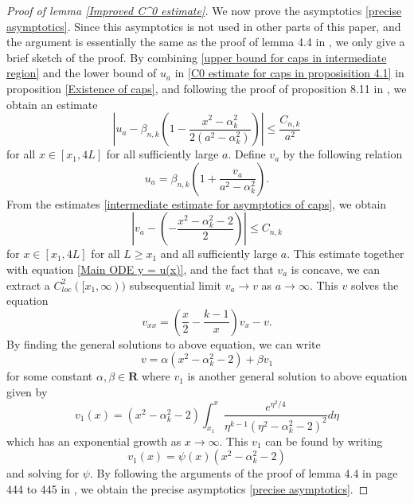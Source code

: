 \documentclass[pdflatex,sn-mathphys-num]{sn-jnl}
\begin{document}
\begin{proof}[Proof of lemma \ref{Improved C^0 estimate}]
We now prove the asymptotics \eqref{precise asymptotics}. Since this asymptotics is not used in other parts of this paper, and the argument is essentially the same as the proof of lemma 4.4 in \cite{ADS}, we only give a brief sketch of the proof. By combining \eqref{upper bound for caps in intermediate region} and the lower bound of $u_a$ in \eqref{C0 estimate for caps in proposisition 4.1} in proposition \ref{Existence of caps}, and following the proof of proposition 8.11 in \cite{ADS}, we obtain an estimate
    \begin{equation}\label{intermediate estimate for asymptotics of caps}
        |u_a - \beta_{n,k}(1 - \frac{x^2 - \alpha_k^2}{2(a^2 - \alpha_k^2)})| \leq \frac{C_{n,k}}{a^2}
    \end{equation}
    for all $x \in [x_1, 4L]$ for all sufficiently large $a$. Define $v_a$ by the following relation
    \begin{equation}
        u_a = \beta_{n,k}(1 + \frac{v_a}{a^2 - \alpha_k^2}).
    \end{equation}
    From the estimates \eqref{intermediate estimate for asymptotics of caps}, we obtain 
    \begin{equation}
        |v_a -(-\frac{x^2 - \alpha_k^2 -2}{2})| \leq C_{n,k}
    \end{equation}
    for $x \in [x_1, 4L]$ for all $L \geq x_1$ and all sufficiently large $a$. This estimate together with equation \eqref{Main ODE y = u(x)}, and the fact that $v_a$ is concave, we can extract a $C^2_{loc}([x_1, \infty))$ subsequential limit $v_a \to v$ as $a \to \infty$.  This $v$ solves the equation
    $$v_{xx} = (\frac{x}{2} - \frac{k-1}{x})v_x - v.$$
    By finding the general solutions to above equation, we can write
    $$v = \alpha(x^2 - \alpha_k^2 - 2) + \beta v_1$$
    for some constant $\alpha, \beta \in \mathbf{R}$ 
    where $v_1$ is another general solution to above equation given by
 \begin{equation}
     v_1(x) = (x^2 - \alpha_k^2-2)\int_{x_1}^{x}\frac{e^{\eta^2/4}}{\eta^{k-1}(\eta^2 - \alpha_k^2 - 2)^2}d\eta
 \end{equation}
    which has an exponential growth as $x \to \infty$.
    This $v_1$ can be found by writing
    $$v_1(x) = \psi(x)(x^2 - \alpha_k^2 - 2)$$
    and solving for $\psi$.
    By following the arguments of the proof of lemma 4.4 in page 444 to 445 in \cite{ADS}, we obtain the precise asymptotics \eqref{precise asymptotics}.
\end{proof}
\end{document}
